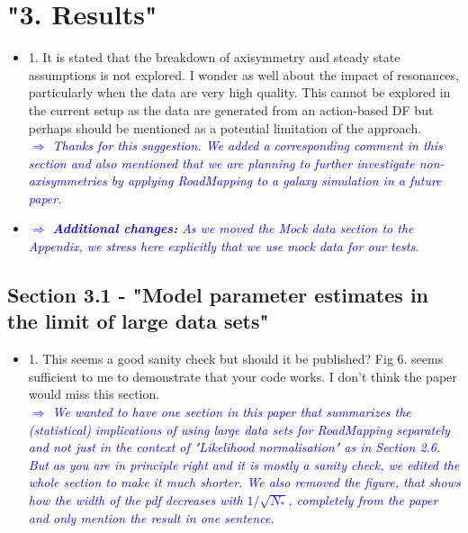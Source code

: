 \documentclass[10pt,a4paper]{article}
\newcommand{\Comment}[1]{\textsl{\textcolor{Blue}{$\Longrightarrow$ {#1}}}}
\newcommand{\RM}{{\sl RoadMapping}}
\begin{document}
\section{"3. Results"}
\begin{itemize}
\item 1. It is stated that the breakdown of axisymmetry and steady state assumptions is not explored. I wonder as well about the impact of resonances, particularly when the data are very high quality. This cannot be explored in the current setup as the data are generated from an action-based DF but perhaps should be mentioned as a potential limitation of the approach. \\\Comment{Thanks for this suggestion. We added a corresponding comment in this section and also mentioned that we are planning to further investigate non-axisymmetries by applying \RM{} to a galaxy simulation in a future paper.}
\item \Comment{\textbf{Additional changes:} As we moved the Mock data section to the Appendix, we stress here explicitly that we use mock data for our tests.}
\end{itemize}


\subsection{Section 3.1 - "Model parameter estimates in the limit of large data sets"}
\begin{itemize}
\item 1. This seems a good sanity check but should it be published? Fig 6. seems sufficient to me to demonstrate that your code works. I don't think the paper would miss this section. \\\Comment{We wanted to have one section in this paper that summarizes the (statistical) implications of using large data sets for \RM{} separately and not just in the context of "Likelihood normalisation" as in Section 2.6. But as you are in principle right and it is mostly a sanity check, we edited the whole section to make it much shorter. We also removed the figure, that shows how the width of the pdf decreases with $1/\sqrt{N_*}$, completely from the paper and only mention the result in one sentence.}
\end{itemize}
\end{document}
